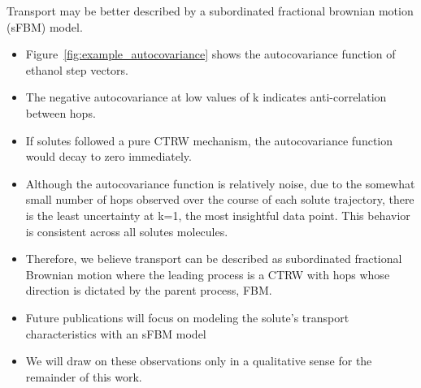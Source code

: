 \documentclass{article}
\begin{document}
  \noindent Transport may be better described by a subordinated fractional brownian motion 
  (sFBM) model.
  \begin{itemize}
  	\item Figure~\ref{fig:example_autocovariance} shows the autocovariance function of 
  	ethanol step vectors. %
  	\item The negative autocovariance at low values of k indicates anti-correlation
  	between hops. 
  	\item If solutes followed a pure CTRW mechanism, the autocovariance function would
  	decay to zero immediately.
  	\item Although the autocovariance function is relatively noise, due to the somewhat small
  	number of hops observed over the course of each solute trajectory, there is the least 
  	uncertainty at k=1, the most insightful data point. This behavior is consistent across
  	all solutes molecules. %
  	\item Therefore, we believe transport can be described as subordinated fractional Brownian
  	motion where the leading process is a CTRW with hops whose direction is dictated by the parent
  	process, FBM.
  	\item Future publications will focus on modeling the solute's transport characteristics
  	with an sFBM model
  	\item We will draw on these observations only in a qualitative sense for the remainder of this work.
  \end{itemize}
  
\end{document}
